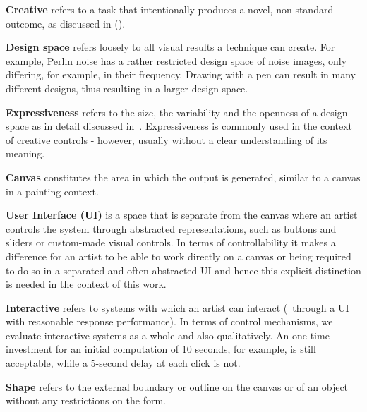 \textbf{Creative} refers to a task that intentionally produces a novel, non-standard outcome, as discussed in (). 

\textbf{Design space} refers loosely to all visual results a technique can create. For example, Perlin noise has a rather restricted design space of noise images, only differing, for example, in their frequency. Drawing with a pen can result in many different designs, thus resulting in a larger design space.

\textbf{Expressiveness} refers to the size, the variability and the openness of a design space as in detail discussed in~. Expressiveness is commonly used in the context of creative controls - however, usually without a clear understanding of its meaning.


\textbf{Canvas} constitutes the area in which the output is generated, similar to a canvas in a painting context.

\textbf{User Interface (UI)} is a space that is separate from the canvas where an artist controls the system through abstracted representations, such as buttons and sliders or custom-made visual controls. In terms of controllability it makes a difference for an artist to be able to work directly on a canvas or being required to do so in a separated and often abstracted UI and hence this explicit distinction is needed in the context of this work.

\textbf{Interactive} refers to systems with which an artist can interact (\eg~through a UI with reasonable response performance). In terms of control mechanisms, we evaluate interactive systems as a whole and also qualitatively. An one-time investment for an initial computation of 10 seconds, for example, is still acceptable, while a 5-second delay at each click is not.

\textbf{Shape} refers to the external boundary or outline on the canvas or of an object without any restrictions on the form. 

